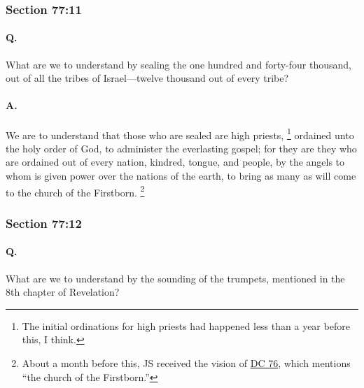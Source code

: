 	\subsubsection{Section 77:11} %
		\label{DC77-11}

		\paragraph{Q.}

			What are we to understand by sealing the one hundred and forty-four thousand, out of all the tribes of Israel—twelve thousand out of every tribe?

		\paragraph{A.}
		
			We are to understand that those who are sealed are high priests,%
				\footnote{%
					The initial ordinations for high priests had happened less than a year before this, I think.
					}
			ordained unto the holy order of God, to administer the everlasting gospel; for they are they who are ordained out of every nation, kindred, tongue, and people, by the angels to whom is given power over the nations of the earth, to bring as many as will come to the church of the Firstborn.%
				\footnote{%
					About a month before this, JS received the vision of \hyperref[DC76]{DC 76}, which mentions ``the church of the Firstborn.''
					}


	\subsubsection{Section 77:12} %
		\label{DC77-12}

		\paragraph{Q.}

			What are we to understand by the sounding of the trumpets, mentioned in the 8th chapter of Revelation?

